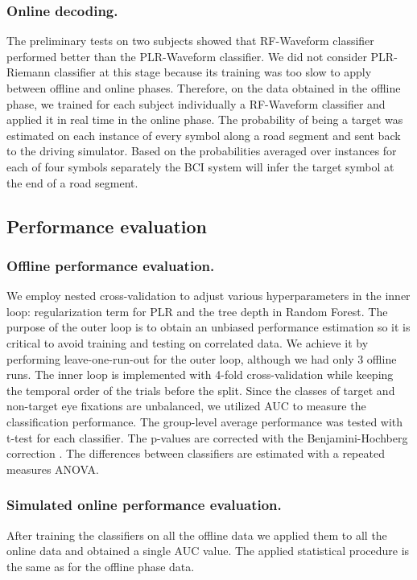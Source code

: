 \documentclass[12pt]{iopart}
\begin{document}
\subsubsection*{Online decoding.}
The preliminary tests on two subjects showed that RF-Waveform classifier
performed better than the PLR-Waveform classifier. We did not consider
PLR-Riemann classifier at this stage because its training
was too slow to apply between offline and online phases.
Therefore, on the data obtained in the offline phase, we trained for each subject individually a RF-Waveform classifier
and applied it in real time in the online phase.
The probability of being a target was estimated on each instance of every symbol along a road segment and sent back to the driving simulator. Based on the probabilities averaged over instances for each of four symbols separately the BCI system will infer the target symbol at the end of a road segment.


\subsection{Performance evaluation}

\subsubsection*{Offline performance evaluation.}
We employ nested cross-validation to adjust various hyperparameters in the inner loop:
regularization term for PLR and the tree depth in Random Forest.
The purpose of the outer loop is to obtain an unbiased performance estimation
so it is critical to avoid training and testing on correlated data.
We achieve it by performing leave-one-run-out for the outer loop,
although we had only 3 offline runs.
The inner loop is implemented with 4-fold cross-validation while keeping
the temporal order of the trials before the split.
Since the classes of target and non-target eye fixations are unbalanced,
we utilized AUC to measure the classification performance.
The group-level average performance was tested with t-test for each classifier.
The p-values are corrected with 
the Benjamini-Hochberg correction \cite{benjamini_controlling_1995}.
The differences between classifiers are estimated with a repeated measures ANOVA.

\subsubsection*{Simulated online performance evaluation.}
After training the classifiers on all the offline data we applied them 
to all the online data and obtained a single AUC value.
The applied statistical procedure is the same as for the offline phase data.
\end{document}
